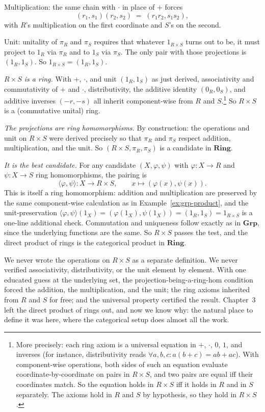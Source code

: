 \begin{example}
Multiplication: the same chain with $\cdot$ in place of $+$ forces
\[ (r_1, s_1)(r_2, s_2) \; = \; (r_1 r_2, s_1 s_2), \]
with $R$'s multiplication on the first coordinate and $S$'s on the
second.

Unit: unitality of $\pi_R$ and $\pi_S$ requires that whatever
$1_{R \times S}$ turns out to be, it must project to $1_R$ via
$\pi_R$ and to $1_S$ via $\pi_S$. The only pair with those
projections is $(1_R, 1_S)$. So $1_{R \times S} = (1_R, 1_S)$.

\textit{$R \times S$ is a ring.} With $+$, $\cdot$, and unit
$(1_R, 1_S)$ as just derived, associativity and commutativity of $+$
and $\cdot$, distributivity, the additive identity $(0_R, 0_S)$, and
additive inverses $(-r, -s)$ all inherit component-wise from $R$ and
$S$.\footnote{More precisely: each ring axiom is a universal
equation in $+$, $\cdot$, $0$, $1$, and inverses (for instance,
distributivity reads $\forall a, b, c : a(b + c) = ab + ac$). With
component-wise operations, both sides of such an equation evaluate
coordinate-by-coordinate on pairs in $R \times S$, and two pairs are
equal iff their coordinates match. So the equation holds in
$R \times S$ iff it holds in $R$ and in $S$ separately. The axioms
hold in $R$ and $S$ by hypothesis, so they hold in $R \times S$.}
So $R \times S$ is a (commutative unital) ring.

\textit{The projections are ring homomorphisms.} By construction: the
operations and unit on $R \times S$ were derived precisely so that
$\pi_R$ and $\pi_S$ respect addition, multiplication, and the unit.
So $(R \times S, \pi_R, \pi_S)$ is a candidate in $\mathbf{Ring}$.

\textit{It is the best candidate.} For any candidate
$(X, \varphi, \psi)$ with $\varphi : X \to R$ and $\psi : X \to S$
ring homomorphisms, the pairing is
\[ \langle \varphi, \psi \rangle : X \to R \times S, \qquad
x \mapsto (\varphi(x), \psi(x)). \]
This is itself a ring homomorphism: addition and multiplication are
preserved by the same component-wise calculation as in
Example~\ref{ex:grp-product}, and the unit-preservation
$\langle \varphi, \psi \rangle(1_X) = (\varphi(1_X), \psi(1_X)) =
(1_R, 1_S) = 1_{R \times S}$ is a one-line additional check.
Commutation and uniqueness follow exactly as in $\mathbf{Grp}$,
since the underlying functions are the same. So $R \times S$ passes
the test, and the direct product of rings is the categorical product
in $\mathbf{Ring}$.
\end{example}

\noindent We never wrote the operations on $R \times S$ as a separate
definition. We never verified associativity, distributivity, or the
unit element by element. With one educated guess at the underlying
set, the projection-being-a-ring-hom condition forced the addition,
the multiplication, and the unit; the ring axioms inherited from
$R$ and $S$ for free; and the universal property certified the
result. Chapter~3 left the direct product of rings out, and now we
know why: the natural place to define it was here, where the
categorical setup does almost all the work.

